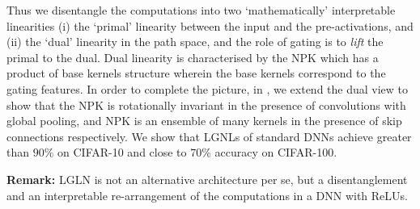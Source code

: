 
Thus we disentangle the computations into two  `mathematically' interpretable linearities (i) the `primal' linearity between the input and the pre-activations, and (ii) the `dual' linearity in the path space, and the role of gating is to \emph{lift} the primal to the dual. Dual linearity is characterised by the NPK which has a product of base kernels structure wherein the base kernels correspond to the gating features. In order to complete the picture, in , we extend the dual view to show that the NPK is rotationally invariant in the presence of convolutions with global pooling, and NPK is an ensemble of many kernels in the presence of skip connections respectively.  We show that LGNLs of standard DNNs achieve greater than $90\%$ on CIFAR-10 and close to $70\%$ accuracy on CIFAR-100. 

\textbf{Remark:} LGLN is not an alternative architecture per se, but a disentanglement and an interpretable re-arrangement of the computations in a DNN with ReLUs.




